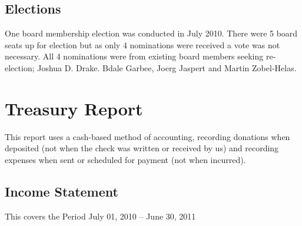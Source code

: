 \documentclass[letterpaper]{report}
\begin{document}
\section{Elections}

One board membership election was conducted in July 2010. There were 5 board
seats up for election but as only 4 nominations were received a vote was not
necessary. All 4 nominations were from existing board members seeking
re-election; Joshua D. Drake. Bdale Garbee, Joerg Jaspert and Martin
Zobel-Helas.

\chapter{Treasury Report}

This report uses a cash-based method of accounting, recording donations when
deposited (not when the check was written or received by us) and recording
expenses when sent or scheduled for payment (not when incurred).

\section{Income Statement}

This covers the Period July 01, 2010 -- June 30, 2011
\end{document}
